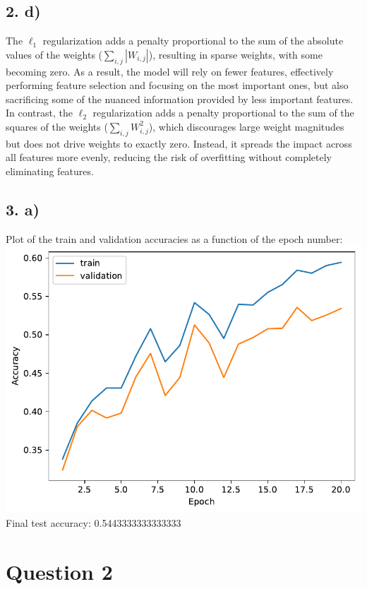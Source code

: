 \documentclass[12pt,a4paper]{article}
\begin{document}
    \subsection{2. d)}      
        The \(\ell_1\) regularization adds a penalty proportional to the sum of the absolute values of the weights (\(\sum_{i,j} |W_{i,j}|\)), resulting in sparse weights, with some becoming zero. As a result, the model will rely on fewer features, effectively performing feature selection and focusing on the most important ones, but also sacrificing some of the nuanced information provided by less important features. In contrast, the \(\ell_2\) regularization adds a penalty proportional to the sum of the squares of the weights (\(\sum_{i,j} W_{i,j}^2\)), which discourages large weight magnitudes but does not drive weights to exactly zero. Instead, it spreads the impact across all features more evenly, reducing the risk of overfitting without completely eliminating features.

    \subsection{3. a)}
        Plot of the train and validation accuracies as a function of the epoch number: \\
        \includegraphics[width=\imagewidth]{q1/q1_3a-accs.pdf} \\
        Final test accuracy: 0.5443333333333333


    \newpage
    \section{Question 2}
\end{document}
